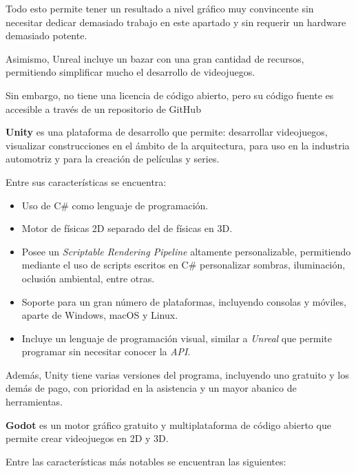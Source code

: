 \documentclass[a4paper,11pt]{book}
\begin{document}
   Todo esto permite tener un resultado a nivel gráfico muy convincente sin necesitar dedicar demasiado trabajo en este apartado y sin requerir un hardware demasiado potente.

\bigskip

Asimismo, Unreal incluye un bazar con una gran cantidad de recursos, permitiendo simplificar mucho el desarrollo de videojuegos.

\bigskip

Sin embargo, no tiene una licencia de código abierto, pero su código fuente es accesible a través de un repositorio de GitHub %

\bigskip

\textbf{Unity} es una plataforma de desarrollo que permite: desarrollar videojuegos, visualizar construcciones en el ámbito de la arquitectura, para uso en la industria automotriz y para la creación de películas y series.

\bigskip

Entre sus características se encuentra:

\begin{itemize}
   \item Uso de C\# como lenguaje de programación.
   \item Motor de físicas 2D separado del de físicas en 3D.
   \item Posee un \textit{Scriptable Rendering Pipeline} altamente personalizable, permitiendo mediante el uso de scripts escritos en C\# personalizar sombras, iluminación, oclusión ambiental, entre otras.
   \item Soporte para un gran número de plataformas, incluyendo consolas y móviles, aparte de Windows, macOS y Linux.
   \item Incluye un lenguaje de programación visual, similar a \textit{Unreal} que permite programar sin necesitar conocer la \textit{API}.
\end{itemize}
   
\bigskip

Además, Unity tiene varias versiones del programa, incluyendo uno gratuito y los demás de pago, con prioridad en la asistencia y un mayor abanico de herramientas.

\bigskip

\textbf{Godot} es un motor gráfico gratuito y multiplataforma de código abierto que permite crear videojuegos en 2D y 3D. 
   
Entre las características más notables se encuentran las siguientes:
\end{document}
